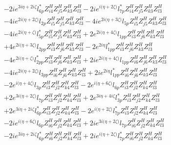 \begin{align}
 &-2 i e^{3 i \eta +2 i \zeta } l_{6p}^* Z_{{i 4}}^{H} Z_{{j 5}}^{H} Z_{{k 3}}^{H} Z_{{l 3}}^{H} -2 i e^{i \Big(\eta +2 \zeta \Big)} l_{7p}^* Z_{{i 4}}^{H} Z_{{j 5}}^{H} Z_{{k 3}}^{H} Z_{{l 3}}^{H} \nonumber \\ 
 &-4 i e^{2 i \Big(\eta +2 \zeta \Big)} l_{2p} Z_{{i 5}}^{H} Z_{{j 5}}^{H} Z_{{k 3}}^{H} Z_{{l 3}}^{H} -4 i e^{2 i \Big(\eta +3 \zeta \Big)} l_{5p} Z_{{i 5}}^{H} Z_{{j 5}}^{H} Z_{{k 3}}^{H} Z_{{l 3}}^{H} \nonumber \\ 
 &-4 i e^{2 i \Big(\eta +\zeta \Big)} l_{5p}^* Z_{{i 5}}^{H} Z_{{j 5}}^{H} Z_{{k 3}}^{H} Z_{{l 3}}^{H} +2 e^{2 i \Big(\eta +4 \zeta \Big)} l_{1pp} Z_{{i 3}}^{H} Z_{{j 6}}^{H} Z_{{k 3}}^{H} Z_{{l 3}}^{H} \nonumber \\ 
 &+4 e^{2 i \Big(\eta +3 \zeta \Big)} l_{2pp} Z_{{i 3}}^{H} Z_{{j 6}}^{H} Z_{{k 3}}^{H} Z_{{l 3}}^{H} -2 e^{2 i \eta } l_{1pp}^* Z_{{i 3}}^{H} Z_{{j 6}}^{H} Z_{{k 3}}^{H} Z_{{l 3}}^{H} \nonumber \\ 
 &-4 e^{2 i \Big(\eta +\zeta \Big)} l_{2pp}^* Z_{{i 3}}^{H} Z_{{j 6}}^{H} Z_{{k 3}}^{H} Z_{{l 3}}^{H} +2 i e^{2 i \Big(\eta +4 \zeta \Big)} l_{1pp} Z_{{i 6}}^{H} Z_{{j 6}}^{H} Z_{{k 3}}^{H} Z_{{l 3}}^{H} \nonumber \\ 
 &-4 i e^{2 i \Big(\eta +2 \zeta \Big)} l_{3pp} Z_{{i 6}}^{H} Z_{{j 6}}^{H} Z_{{k 3}}^{H} Z_{{l 3}}^{H} +2 i e^{2 i \eta } l_{1pp}^* Z_{{i 6}}^{H} Z_{{j 6}}^{H} Z_{{k 3}}^{H} Z_{{l 3}}^{H} \nonumber \\ 
 &-2 e^{i \Big(\eta +4 \zeta \Big)} l_{3p} Z_{{i 3}}^{H} Z_{{j 2}}^{H} Z_{{k 4}}^{H} Z_{{l 3}}^{H} -2 e^{i \Big(\eta +6 \zeta \Big)} l_{6p} Z_{{i 3}}^{H} Z_{{j 2}}^{H} Z_{{k 4}}^{H} Z_{{l 3}}^{H} \nonumber \\ 
 &+2 e^{3 i \Big(\eta +2 \zeta \Big)} l_{7p} Z_{{i 3}}^{H} Z_{{j 2}}^{H} Z_{{k 4}}^{H} Z_{{l 3}}^{H} +2 e^{3 i \eta +4 i \zeta } l_{3p}^* Z_{{i 3}}^{H} Z_{{j 2}}^{H} Z_{{k 4}}^{H} Z_{{l 3}}^{H} \nonumber \\ 
 &+2 e^{3 i \eta +2 i \zeta } l_{6p}^* Z_{{i 3}}^{H} Z_{{j 2}}^{H} Z_{{k 4}}^{H} Z_{{l 3}}^{H} -2 e^{i \Big(\eta +2 \zeta \Big)} l_{7p}^* Z_{{i 3}}^{H} Z_{{j 2}}^{H} Z_{{k 4}}^{H} Z_{{l 3}}^{H} \nonumber \\ 
 &-2 i e^{i \Big(\eta +6 \zeta \Big)} l_{6p} Z_{{i 6}}^{H} Z_{{j 2}}^{H} Z_{{k 4}}^{H} Z_{{l 3}}^{H} +2 i e^{3 i \Big(\eta +2 \zeta \Big)} l_{7p} Z_{{i 6}}^{H} Z_{{j 2}}^{H} Z_{{k 4}}^{H} Z_{{l 3}}^{H} \nonumber \\ 
 &-2 i e^{3 i \eta +2 i \zeta } l_{6p}^* Z_{{i 6}}^{H} Z_{{j 2}}^{H} Z_{{k 4}}^{H} Z_{{l 3}}^{H} +2 i e^{i \Big(\eta +2 \zeta \Big)} l_{7p}^* Z_{{i 6}}^{H} Z_{{j 2}}^{H} Z_{{k 4}}^{H} Z_{{l 3}}^{H} \nonumber \\ 

\end{align}
